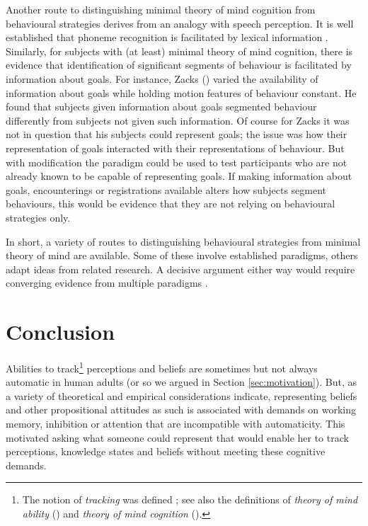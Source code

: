 \documentclass[12pt,\papersize]{extarticle}
\begin{document}
Another route to distinguishing minimal theory of mind cognition from behavioural strategies derives from an analogy with speech perception.  It is well established that phoneme recognition is facilitated by lexical information \citep[]{en_1704}.  Similarly, for subjects with (at least) minimal theory of mind cognition, there is evidence that identification of significant segments of behaviour is facilitated by information about goals.  For instance, Zacks (\citeyear[]{en_1442}) varied the availability of information about goals while holding motion features of behaviour constant.  He found that subjects given information about goals segmented behaviour differently from subjects not given such information.  Of course for Zacks it was not in question that his subjects could represent goals; the issue was how their representation of goals interacted with their representations of behaviour.  But with modification the  paradigm could be used to test participants who are not already known to be capable of representing goals.  If making information about goals, encounterings or registrations available alters how subjects segment behaviours, this would be evidence that they are not relying on behavioural strategies only.

In short, a variety of routes to distinguishing behavioural strategies from minimal theory of mind are available.  Some of these involve established paradigms, others adapt ideas from related research.  A decisive argument either way would require converging evidence from multiple paradigms \citep[p.\ 622]{premack_does_1978}.  






\section{Conclusion}

Abilities to track\footnote{
The notion of \emph{tracking} was defined  ; see also the definitions of \emph{theory of mind ability} () and \emph{theory of mind cognition} ().
}
perceptions and beliefs are  sometimes but not always  automatic in human adults (or so we argued in Section \ref{sec:motivation}).   
But, as a variety of theoretical and empirical considerations indicate,  representing beliefs and other propositional attitudes as such is associated with demands on working memory, inhibition or attention that are incompatible with automaticity.
This motivated asking what  someone could represent that would enable her to track perceptions, knowledge states and beliefs without meeting these cognitive demands.
\end{document}
